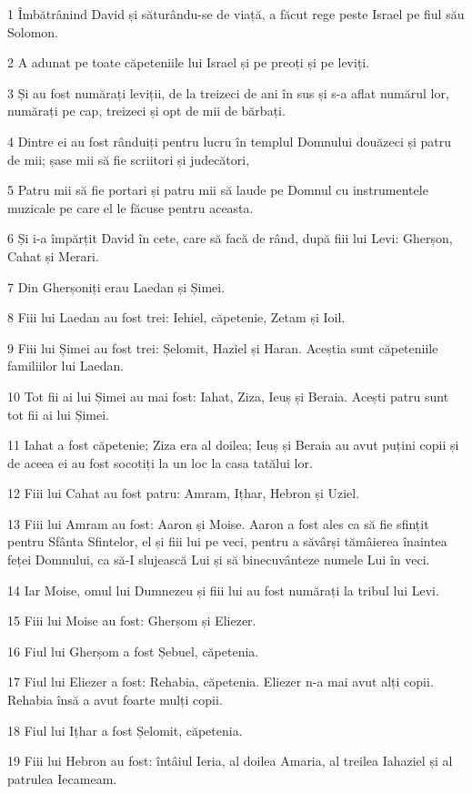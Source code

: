 \par 1 Îmbătrânind David și săturându-se de viață, a făcut rege peste Israel pe fiul său Solomon.
\par 2 A adunat pe toate căpeteniile lui Israel și pe preoți și pe leviți.
\par 3 Și au fost numărați leviții, de la treizeci de ani în sus și s-a aflat numărul lor, numărați pe cap, treizeci și opt de mii de bărbați.
\par 4 Dintre ei au fost rânduiți pentru lucru în templul Domnului douăzeci și patru de mii; șase mii să fie scriitori și judecători,
\par 5 Patru mii să fie portari și patru mii să laude pe Domnul cu instrumentele muzicale pe care el le făcuse pentru aceasta.
\par 6 Și i-a împărțit David în cete, care să facă de rând, după fiii lui Levi: Gherșon, Cahat și Merari.
\par 7 Din Gherșoniți erau Laedan și Șimei.
\par 8 Fiii lui Laedan au fost trei: Iehiel, căpetenie, Zetam și Ioil.
\par 9 Fiii lui Șimei au fost trei: Șelomit, Haziel și Haran. Aceștia sunt căpeteniile familiilor lui Laedan.
\par 10 Tot fii ai lui Șimei au mai fost: Iahat, Ziza, Ieuș și Beraia. Acești patru sunt tot fii ai lui Șimei.
\par 11 Iahat a fost căpetenie; Ziza era al doilea; Ieuș și Beraia au avut puțini copii și de aceea ei au fost socotiți la un loc la casa tatălui lor.
\par 12 Fiii lui Cahat au fost patru: Amram, Ițhar, Hebron și Uziel.
\par 13 Fiii lui Amram au fost: Aaron și Moise. Aaron a fost ales ca să fie sfințit pentru Sfânta Sfintelor, el și fiii lui pe veci, pentru a săvârși tămâierea înaintea feței Domnului, ca să-I slujească Lui și să binecuvânteze numele Lui în veci.
\par 14 Iar Moise, omul lui Dumnezeu și fiii lui au fost numărați la tribul lui Levi.
\par 15 Fiii lui Moise au fost: Gherșom și Eliezer.
\par 16 Fiul lui Gherșom a fost Șebuel, căpetenia.
\par 17 Fiul lui Eliezer a fost: Rehabia, căpetenia. Eliezer n-a mai avut alți copii. Rehabia însă a avut foarte mulți copii.
\par 18 Fiul lui Ițhar a fost Șelomit, căpetenia.
\par 19 Fiii lui Hebron au fost: întâiul Ieria, al doilea Amaria, al treilea Iahaziel și al patrulea Iecameam.
